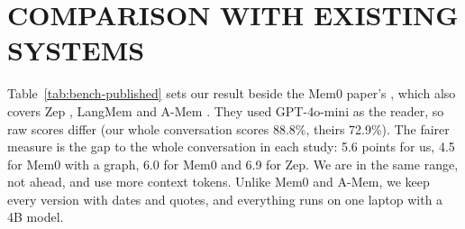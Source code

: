 \section{\uppercase{Comparison with Existing Systems}}
\label{sec:comparison}
Table~\ref{tab:bench-published} sets our result beside the Mem0 paper's
\cite{chhikara2025mem0}, which also covers Zep \cite{rasmussen2025zep}, LangMem
\cite{langchain2025langmem} and A-Mem \cite{xu2025amem}. They used GPT-4o-mini as the reader, so
raw scores differ (our whole conversation scores 88.8\%, theirs 72.9\%). The fairer measure is the
gap to the whole conversation in each study: 5.6 points for us, 4.5 for Mem0 with a graph, 6.0
for Mem0 and 6.9 for Zep. We are in the same range, not ahead, and use more context tokens.
Unlike Mem0 and A-Mem, we keep every version with dates and quotes, and everything runs on one
laptop with a 4B model.


